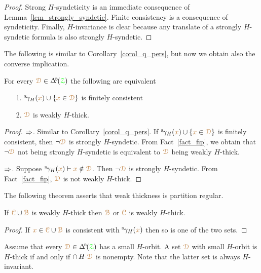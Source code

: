\begin{proof}
  Strong $H$-syndeticity is an immediate consequence of Lemma~\ref{lem_strongly_syndetic}.
  Finite consistency is a consequence of syndeticity.
  Finally, $H$-invariance is clear because any translate of a strongly $H$-syndetic formula is also strongly $H$-syndetic.
\end{proof}

The following is similar to Corollary~\ref{corol_q_pers}, but now we obtain also the converse implication.

\begin{corollary}\label{corol_q_w_pers}
  For every $\mrD\in\BDelta(\grZ)$ the following are equivalent
  \begin{itemize}
    \item [1.] ${}^{\rm s}\kern-.2ex\gamma_H({\color{brown} x})\cup\{{\color{brown} x}\in{\color{brown}\EuScript D}\}$ is finitely consistent
    \item [2.] ${\color{brown}\EuScript D}$ is weakly $H$-thick.
  \end{itemize}
\end{corollary}

\begin{proof}
  $\Rightarrow$. 
  Similar to Corollary~\ref{corol_q_pers}.
  If ${}^{\rm s}\kern-.2ex\gamma_H({\color{brown} x})\cup\{{\color{brown} x}\in{\color{brown}\EuScript D}\}$ is finitely consistent, then $\neg{\color{brown}\EuScript D}$ is strongly $H$-syndetic.
  From Fact~\ref{fact_fip}, we obtain that $\neg{\color{brown}\EuScript D}$ not being strongly $H$-syndetic is equivalent to ${\color{brown}\EuScript D}$ being weakly $H$-thick.

  $\Rightarrow$.
  Suppose ${}^{\rm s}\kern-.2ex\gamma_H({\color{brown} x})\vdash{\color{brown}x}\notin{\color{brown}\EuScript D}$.
  Then $\neg{\color{brown}\EuScript D}$ is strongly $H$-syndetic.
  From Fact~\ref{fact_fip}, ${\color{brown}\EuScript D}$ is not weakly $H$-thick.
\end{proof}

The following theorem asserts that weak thickness is partition regular.

\begin{theorem}\label{thm_wt_partreg}
  If ${\color{brown}\EuScript C}\cup{\color{brown}\EuScript B}$ is weakly $H$-thick then ${\color{brown}\EuScript B}$ or ${\color{brown}\EuScript C}$ is weakly $H$-thick.
\end{theorem}

\begin{proof}
  If ${\color{brown} x}\in {\color{brown}\EuScript C}\cup{\color{brown}\EuScript B}$ is consistent with ${}^{\rm s}\kern-.2ex\gamma_H({\color{brown} x})$ then so is one of the two sets.
\end{proof}

Assume that every $\mrD\in\BDelta(\grZ)$ has a small $H$-orbit.
A set ${\color{brown}\EuScript D}$ with small $H$-orbit is $H$-thick if and only if $\cap\,H{\cdot}{\color{brown}\EuScript D}$ is nonempty.
Note that the latter set is always $H$-invariant.

